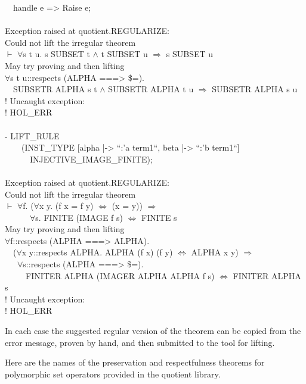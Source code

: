 \documentclass[envcountsame,runningheads]{llncs}
\begin{document}
{\begin{tabbing}
\ \ handle e => Raise e;  \\
  \\
Exception raised at quotient.REGULARIZE:  \\
Could not lift the irregular theorem  \\
$\vdash$ $\forall$s t u. s SUBSET t $\wedge$ t SUBSET u $\Rightarrow$ s SUBSET u  \\
May try proving and then lifting  \\
$\forall$s t u::respects (ALPHA ===> \$=).  \\
\ \ SUBSETR ALPHA s t $\wedge$ SUBSETR ALPHA t u $\Rightarrow$ SUBSETR ALPHA s u  \\
! Uncaught exception:   \\
! HOL\_ERR  \\
  \\
- LIFT\_RULE  \\
\ \ \ \ (INST\_TYPE [alpha |-> ``:'a term1``, beta |-> ``:'b term1``]  \\
\ \ \ \ \ \        INJECTIVE\_IMAGE\_FINITE);  \\
  \\
Exception raised at quotient.REGULARIZE:  \\
Could not lift the irregular theorem  \\
$\vdash$ $\forall$f.
        ($\forall$x y. (f x = f y) $\Leftrightarrow$ (x = y)) $\Rightarrow$  \\
\ \ \ \ \ \ $\forall$s. FINITE (IMAGE f s) $\Leftrightarrow$ FINITE s  \\
May try proving and then lifting  \\
$\forall$f::respects (ALPHA ===> ALPHA).  \\
\ \ ($\forall$x y::respects ALPHA. ALPHA (f x) (f y) $\Leftrightarrow$ ALPHA x y) $\Rightarrow$  \\
\ \ \ $\forall$s::respects (ALPHA ===> \$=).  \\
\ \ \ \ \ FINITER ALPHA (IMAGER ALPHA ALPHA f s) $\Leftrightarrow$ FINITER ALPHA s  \\
! Uncaught exception:   \\
! HOL\_ERR
\end{tabbing}}

In each case the suggested regular version of the theorem can be
copied from the error message,
proven by hand, and then submitted to the tool for lifting.

Here are the names of the preservation and respectfulness theorems
for polymorphic set operators provided in the quotient library.
\end{document}
